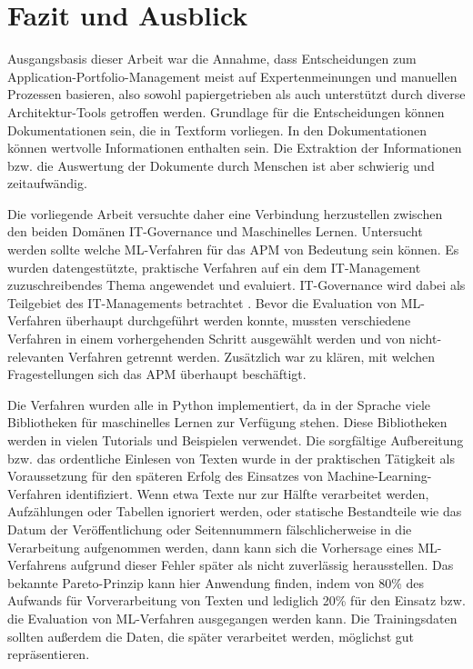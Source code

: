 \chapter{Fazit und Ausblick}
\label{chap5}

Ausgangsbasis dieser Arbeit war die Annahme, dass Entscheidungen zum Application-Portfolio-Management meist auf Expertenmeinungen und manuellen Prozessen basieren, also sowohl papiergetrieben als auch unterstützt durch diverse Architektur-Tools getroffen werden. Grundlage für die Entscheidungen können Dokumentationen sein, die in Textform vorliegen. In den Dokumentationen können wertvolle Informationen enthalten sein. Die Extraktion der Informationen bzw. die Auswertung der Dokumente durch Menschen ist aber schwierig und zeitaufwändig. 

Die vorliegende Arbeit versuchte daher eine Verbindung herzustellen zwischen den beiden Domänen IT-Governance und Maschinelles Lernen. Untersucht werden sollte welche ML-Verfahren für das APM von Bedeutung sein können. Es wurden datengestützte, praktische Verfahren auf ein dem IT-Management zuzuschreibendes Thema angewendet und evaluiert. IT-Governance wird dabei als Teilgebiet des IT-Managements betrachtet \cite[S. 6]{reiss}. Bevor die Evaluation von ML-Verfahren überhaupt durchgeführt werden konnte, mussten verschiedene Verfahren in einem vorhergehenden Schritt ausgewählt werden und von nicht-relevanten Verfahren getrennt werden. Zusätzlich war zu klären, mit welchen Fragestellungen sich das APM überhaupt beschäftigt.

Die Verfahren wurden alle in Python implementiert, da in der Sprache viele Bibliotheken für maschinelles Lernen zur Verfügung stehen. Diese Bibliotheken werden in vielen Tutorials und Beispielen verwendet. Die sorgfältige Aufbereitung bzw. das ordentliche Einlesen von Texten wurde in der praktischen Tätigkeit als Voraussetzung für den späteren Erfolg des Einsatzes von Machine-Learning-Verfahren identifiziert. Wenn etwa Texte nur zur Hälfte verarbeitet werden, Aufzählungen oder Tabellen ignoriert werden, oder statische Bestandteile wie das Datum der Veröffentlichung oder Seitennummern fälschlicherweise in die Verarbeitung aufgenommen werden, dann kann sich die Vorhersage eines ML-Verfahrens aufgrund dieser Fehler später als nicht zuverlässig herausstellen. Das bekannte Pareto-Prinzip kann hier Anwendung finden, indem von 80\% des Aufwands für Vorverarbeitung von Texten und lediglich 20\% für den Einsatz bzw. die Evaluation von ML-Verfahren ausgegangen werden kann. Die Trainingsdaten sollten außerdem die Daten, die später verarbeitet werden, möglichst gut repräsentieren. 

